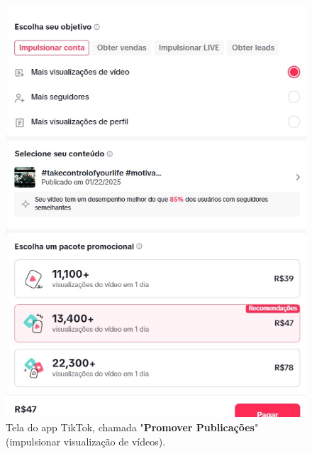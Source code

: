 \begin{figure}[H]
    \centering
    \begin{minipage}{0.45\textwidth}
        \centering
        \includegraphics[width=\linewidth]{Relatório/Figuras/promover_publicação1.jpg}
        \caption{Tela do app TikTok, chamada "\textbf{Promover Publicações}" (impulsionar visualização de vídeos).}
        \label{fig:promover_publicacao1}
    \end{minipage}\hfill
    \begin{minipage}{0.45\textwidth}
        \centering

\end{minipage}
\end{figure}
